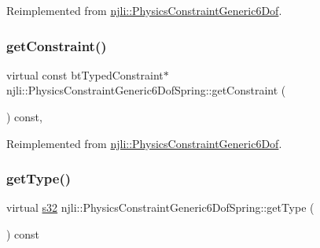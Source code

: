 Reimplemented from \mbox{\hyperlink{classnjli_1_1_physics_constraint_generic6_dof_a0591b18e41f1e1e349ba3cef3e8cf4a4}{njli\+::\+Physics\+Constraint\+Generic6\+Dof}}.

\mbox{\label{classnjli_1_1_physics_constraint_generic6_dof_spring_a072c17a336b74f574c9892e8ccf12278}} 
\subsubsection{\texorpdfstring{get\+Constraint()}{getConstraint()}\hspace{0.1cm}{\footnotesize\ttfamily [2/2]}}
{\footnotesize\ttfamily virtual const bt\+Typed\+Constraint$\ast$ njli\+::\+Physics\+Constraint\+Generic6\+Dof\+Spring\+::get\+Constraint (\begin{DoxyParamCaption}{ }\end{DoxyParamCaption}) const\hspace{0.3cm}{\ttfamily [protected]}, {\ttfamily [virtual]}}



Reimplemented from \mbox{\hyperlink{classnjli_1_1_physics_constraint_generic6_dof_a55d44efd5fb9dcd1f983f3bb5f2ac6d5}{njli\+::\+Physics\+Constraint\+Generic6\+Dof}}.

\mbox{\label{classnjli_1_1_physics_constraint_generic6_dof_spring_a2fecef82051a7d6f1a51a81ca5621798}} 
\subsubsection{\texorpdfstring{get\+Type()}{getType()}}
{\footnotesize\ttfamily virtual \mbox{\hyperlink{_util_8h_aa62c75d314a0d1f37f79c4b73b2292e2}{s32}} njli\+::\+Physics\+Constraint\+Generic6\+Dof\+Spring\+::get\+Type (\begin{DoxyParamCaption}{ }\end{DoxyParamCaption}) const\hspace{0.3cm}{\ttfamily [virtual]}}

